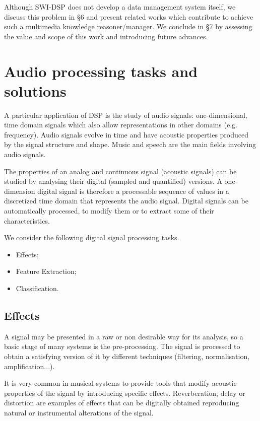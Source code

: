 \documentclass[runningheads]{llncs}
\begin{document}
Although SWI-DSP does not develop a data management system itself, we discuss this problem in \S 6 and present related works which contribute to achieve such a multimedia knowledge reasoner/manager. We conclude in \S 7 by assessing the value and scope of this work and introducing future advances.

\section{Audio processing tasks and solutions}\label{sec:tasks}

A particular application of DSP is the study of audio signals: one-dimensional, time domain signals which also allow representations in other domains (e.g. frequency). Audio signals evolve in time and have acoustic properties produced by the signal structure and shape. Music and speech are the main fields involving audio signals.

The properties of an analog and continuous signal (acoustic signals) can be studied by analysing their digital (sampled and quantified) versions. A one-dimension digital signal is therefore a processable sequence of values in a discretized time domain that represents the audio signal. Digital signals can be automatically processed, to modify them or to extract some of their characteristics.

We consider the following digital signal processing tasks.

\begin{itemize}
 \item Effects;
 \item Feature Extraction;
 \item Classification.
\end{itemize}

\subsection{Effects}\label{subsec:effects}
A signal may be presented in a raw or non desirable way for its analysis, so a basic stage of many systems is the pre-processing. The signal is processed to obtain a satisfying version of it by different techniques (filtering, normalisation, amplification...).

It is very common in musical systems to provide tools that modify acoustic properties of the signal by introducing specific effects. Reverberation, delay or distortion are examples of effects that can be digitally obtained reproducing natural or instrumental alterations of the signal.
\end{document}
